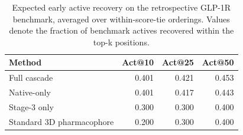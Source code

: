 \begin{table}[htbp]
\centering
\normalsize
\caption{Expected early active recovery on the retrospective GLP-1R benchmark, averaged over within-score-tie orderings. Values denote the fraction of benchmark actives recovered within the top-k positions.}
\label{tab:benchmark_summary_recovery}
\setlength{\tabcolsep}{4pt}
\begin{tabular}{lrrr}
\toprule
Method & Act@10 & Act@25 & Act@50 \\
\midrule
Full cascade & 0.401 & 0.421 & 0.453 \\
Native-only & 0.401 & 0.417 & 0.443 \\
Stage-3 only & 0.300 & 0.300 & 0.400 \\
Standard 3D pharmacophore & 0.200 & 0.300 & 0.400 \\
\bottomrule
\end{tabular}
\end{table}